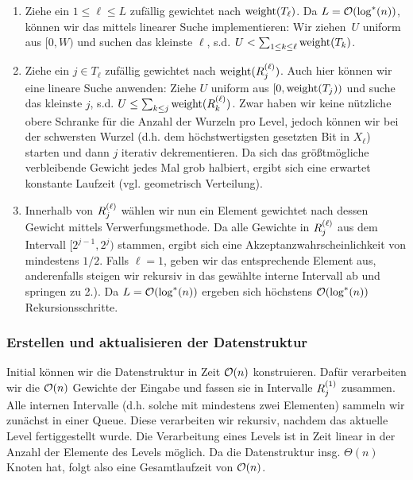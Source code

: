 \begin{enumerate}
    \item Ziehe ein $1 \le \ell \le L$ zufällig gewichtet nach $\mathrm{weight}(T_\ell)$.
          Da $L = \mathcal{O}\!\left(\log^*(n)\right)$, können wir das mittels linearer Suche implementieren:
          Wir ziehen~$U$ uniform aus $[0, W)$ und suchen das kleinste $\ell$, s.d. $U < \sum_{1\le k \le \ell} \mathrm{weight}(T_k)$.

    \item Ziehe ein $j \in T_\ell$ zufällig gewichtet nach $\mathrm{weight}(R^{(\ell)}_{j})$.
          Auch hier können wir eine lineare Suche anwenden:
          Ziehe $U$ uniform aus $[0, \mathrm{weight}(T_j))$ und suche das kleinste $j$, s.d. $U \le \sum_{k \le j} \mathrm{weight}(R^{(\ell)}_{k})$.
          Zwar haben wir keine nützliche obere Schranke für die Anzahl der Wurzeln pro Level, jedoch können wir bei der schwersten Wurzel (d.h. dem höchstwertigsten gesetzten Bit in $X_\ell$) starten und dann $j$ iterativ dekrementieren.
          Da sich das größtmögliche verbleibende Gewicht jedes Mal grob halbiert, ergibt sich eine erwartet konstante Laufzeit (vgl. geometrisch Verteilung).

    \item Innerhalb von $R^{(\ell)}_{j}$ wählen wir nun ein Element gewichtet nach dessen Gewicht mittels Verwerfungsmethode.
          Da alle Gewichte in $R^{(\ell)}_{j}$ aus dem Intervall $[2^{j-1}, 2^j)$ stammen, ergibt sich eine Akzeptanzwahrscheinlichkeit von mindestens $1/2$.
          Falls $\ell = 1$, geben wir das entsprechende Element aus, anderenfalls steigen wir rekursiv in das gewählte interne Intervall ab und springen zu 2.).
          Da $L = \mathcal{O}\!\left(\log^*(n)\right)$ ergeben sich höchstens $\mathcal{O}\!\left(\log^*(n)\right)$ Rekursionsschritte.
\end{enumerate}

\subsubsection{Erstellen und aktualisieren der Datenstruktur}
Initial können wir die Datenstruktur in Zeit $\mathcal{O}\!\left(n\right)$ konstruieren.
Dafür verarbeiten wir die $\mathcal{O}\!\left(n\right)$ Gewichte der Eingabe und fassen sie in Intervalle $R^{(1)}_{j}$ zusammen.
Alle internen Intervalle (d.h. solche mit mindestens zwei Elementen) sammeln wir zunächst in einer Queue.
Diese verarbeiten wir rekursiv, nachdem das aktuelle Level fertiggestellt wurde.
Die Verarbeitung eines Levels ist in Zeit linear in der Anzahl der Elemente des Levels möglich.
Da die Datenstruktur insg. $\Theta(n)$ Knoten hat, folgt also eine Gesamtlaufzeit von $\mathcal{O}\!\left(n\right)$.

